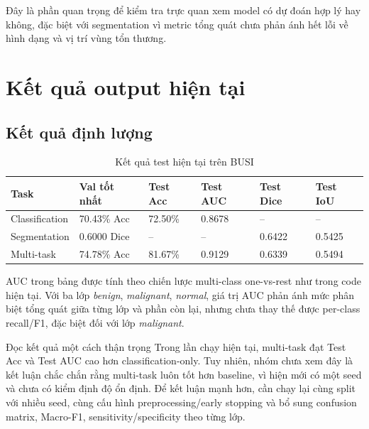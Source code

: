\documentclass[12pt,a4paper]{article}
\begin{document}
Đây là phần quan trọng để kiểm tra trực quan xem model có dự đoán hợp lý hay không, đặc biệt với segmentation vì metric tổng quát chưa phản ánh hết lỗi về hình dạng và vị trí vùng tổn thương.

\section{Kết quả output hiện tại}

\subsection{Kết quả định lượng}

\begin{table}[H]
\centering
\caption{Kết quả test hiện tại trên BUSI}
\renewcommand{\arraystretch}{1.25}
\begin{tabular}{p{3.2cm} p{2.2cm} p{2.2cm} p{2.2cm} p{2.2cm} p{2.2cm}}
\toprule
\textbf{Task} & \textbf{Val tốt nhất} & \textbf{Test Acc} & \textbf{Test AUC} & \textbf{Test Dice} & \textbf{Test IoU} \\
\midrule
Classification & 70.43\% Acc & 72.50\% & 0.8678 & -- & -- \\
Segmentation & 0.6000 Dice & -- & -- & 0.6422 & 0.5425 \\
Multi-task & 74.78\% Acc & 81.67\% & 0.9129 & 0.6339 & 0.5494 \\
\bottomrule
\end{tabular}
\end{table}

\noindent AUC trong bảng được tính theo chiến lược multi-class one-vs-rest như trong code hiện tại. Với ba lớp \textit{benign}, \textit{malignant}, \textit{normal}, giá trị AUC phản ánh mức phân biệt tổng quát giữa từng lớp và phần còn lại, nhưng chưa thay thế được per-class recall/F1, đặc biệt đối với lớp \textit{malignant}.

\begin{methodbox}{Đọc kết quả một cách thận trọng}
Trong lần chạy hiện tại, multi-task đạt Test Acc và Test AUC cao hơn classification-only. Tuy nhiên, nhóm chưa xem đây là kết luận chắc chắn rằng multi-task luôn tốt hơn baseline, vì hiện mới có một seed và chưa có kiểm định độ ổn định. Để kết luận mạnh hơn, cần chạy lại cùng split với nhiều seed, cùng cấu hình preprocessing/early stopping và bổ sung confusion matrix, Macro-F1, sensitivity/specificity theo từng lớp.
\end{methodbox}
\end{document}
